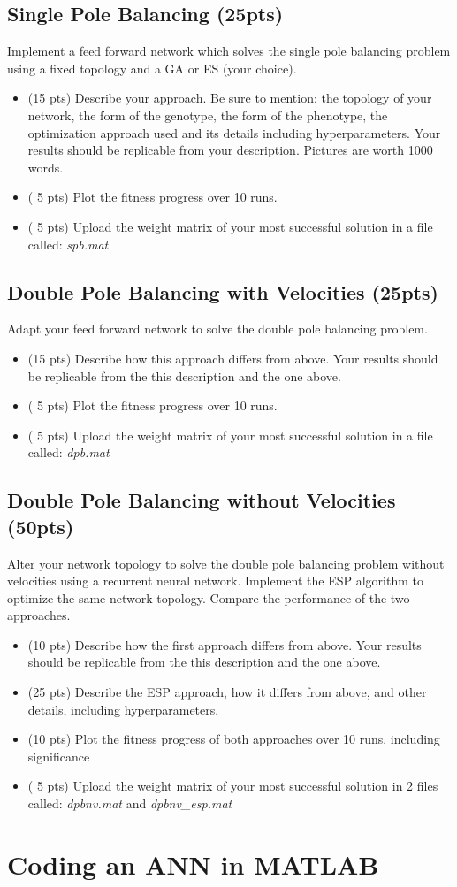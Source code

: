 \documentclass{article}
\begin{document}
\subsection{Single Pole Balancing (25pts)}
Implement a feed forward network which solves the single pole balancing problem using a fixed topology and a GA or ES (your choice).
\begin{itemize}
	\item (15 pts) Describe your approach. Be sure to mention: the topology of your network, the form of the genotype, the form of the phenotype, the optimization approach used and its details including hyperparameters. Your results should be replicable from your description. Pictures are worth 1000 words.
	\item ( 5 pts) Plot the fitness progress over 10 runs.
	\item ( 5 pts) Upload the weight matrix of your most successful solution in a file called: \textit{spb.mat}
\end{itemize}

\newpage
\subsection{Double Pole Balancing with Velocities (25pts)}
Adapt your feed forward network to solve the double pole balancing problem.
\begin{itemize}
	\item (15 pts) Describe how this approach differs from above. Your results should be replicable from the this description and the one above.
	\item ( 5 pts) Plot the fitness progress over 10 runs.
	\item ( 5 pts) Upload the weight matrix of your most successful solution in a file called: \textit{dpb.mat}
\end{itemize}

\newpage
\subsection{Double Pole Balancing without Velocities (50pts)}
Alter your network topology to solve the double pole balancing problem without velocities using a recurrent neural network. Implement the ESP algorithm to optimize the same network topology. Compare the performance of the two approaches.
\begin{itemize}
	\item (10 pts) Describe how the first approach differs from above. Your results should be replicable from the this description and the one above.
	\item (25 pts) Describe the ESP approach, how it differs from above, and other details, including hyperparameters.
	\item (10 pts) Plot the fitness progress of both approaches over 10 runs, including significance
	\item ( 5 pts) Upload the weight matrix of your most successful solution in 2 files called: \textit{dpbnv.mat} and \textit{dpbnv\_esp.mat}
\end{itemize}

\newpage
\section{Coding an ANN in MATLAB}
\end{document}
